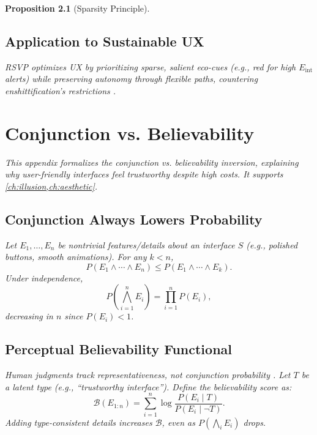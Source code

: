\documentclass[openany]{book}
\newtheorem{proposition}{Proposition}[chapter]
\newcommand{\Eint}{E_{\mathrm{int}}} %
\begin{document}
\begin{proposition}[Sparsity Principle]
\section{Application to Sustainable UX}
\label{sec:rsvp-application}
RSVP optimizes UX by prioritizing sparse, salient eco-cues (e.g., red for high $\Eint$ alerts) while preserving autonomy through flexible paths, countering enshittification’s restrictions \citep{doctorow2022}.

\chapter{Conjunction vs. Believability}
\label{app:conjunction}

This appendix formalizes the conjunction vs. believability inversion, explaining why user-friendly interfaces feel trustworthy despite high costs. It supports \cref{ch:illusion,ch:aesthetic}.

\section{Conjunction Always Lowers Probability}
\label{sec:conj-prob}
Let $E_1,\dots,E_n$ be nontrivial features/details about an interface $S$ (e.g., polished buttons, smooth animations). For any $k<n$,
\begin{equation}
\label{eq:conj-prob}
P(E_1 \land \cdots \land E_n) \leq P(E_1 \land \cdots \land E_k).
\end{equation}
Under independence,
\begin{equation}
\label{eq:conj-indep}
P\!\left(\bigwedge_{i=1}^n E_i\right) = \prod_{i=1}^n P(E_i),
\end{equation}
decreasing in $n$ since $P(E_i) < 1$.

\section{Perceptual Believability Functional}
\label{sec:conj-believability}
Human judgments track representativeness, not conjunction probability \citep{tversky1983}. Let $T$ be a latent type (e.g., \enquote{trustworthy interface}). Define the believability score as:
\begin{equation}
\label{eq:believability-functional}
\mathcal{B}(E_{1:n}) = \sum_{i=1}^n \log \frac{P(E_i \mid T)}{P(E_i \mid \neg T)}.
\end{equation}
Adding type-consistent details increases $\mathcal{B}$, even as $P(\bigwedge_i E_i)$ drops.


\end{proposition}
\end{document}
